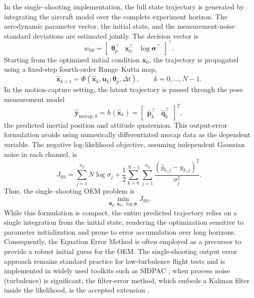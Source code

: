 \documentclass[11pt]{article}
\begin{document}
In the single--shooting implementation, the full state trajectory is generated by
integrating the aircraft model over the complete experiment horizon.
The aerodynamic parameter vector, the initial state, and the measurement-noise
standard deviations are estimated jointly. The decision vector is
\[
    w_{\mathrm{SS}}
    =
    \begin{bmatrix}
        \boldsymbol{\theta}_p^\top &
        \mathbf{x}_0^\top &
        \log\boldsymbol{\sigma}^\top
    \end{bmatrix}^{\!\top}.
\]
Starting from the optimized initial condition $\mathbf{x}_0$, the trajectory is
propagated using a fixed-step fourth-order Runge--Kutta map,
\[
    \hat{\mathbf{x}}_{k+1}
    =
    \Phi(\hat{\mathbf{x}}_k,\mathbf{u}_k;\boldsymbol{\theta}_p,\Delta t),
    \qquad k=0,\ldots,N-1.
\]
In the motion-capture setting,
the latent trajectory is passed through the pose measurement model
\[
\hat{\mathbf{y}}_{\mathrm{mocap},k}
=h(\hat{\mathbf{x}}_k)
=
\begin{bmatrix}
\hat{\mathbf{p}}_k^{\top} & \hat{\mathbf{q}}_k^{\top}
\end{bmatrix}^{T},
\]
the predicted inertial position and attitude quaternion. This output-error
formulation avoids using numerically differentiated mocap data as the
dependent variable. The negative log-likelihood
objective, assuming independent Gaussian noise in each channel, is
\[
    J_{\mathrm{SS}}
    =
    \sum_{j=1}^{n_y} N\log\sigma_j
    +
    \frac{1}{2}
    \sum_{k=0}^{N-1}
    \sum_{j=1}^{n_y}
    \frac{\left(\hat{y}_{k,j}-y_{k,j}\right)^2}{\sigma_j^2}.
\]
Thus, the single--shooting OEM problem is
\[
    \min_{\boldsymbol{\theta}_p,\,\mathbf{x}_0,\,\log\boldsymbol{\sigma}}
    J_{\mathrm{SS}}.
\]
While this formulation is compact, the entire predicted trajectory relies on a single integration from the initial state, rendering the optimization sensitive to parameter initialization and prone to error accumulation over long horizons. Consequently, the Equation Error Method is often employed as a precursor to provide a robust initial guess for the OEM. The single-shooting output error approach remains standard practice for low-turbulence flight tests and is implemented in widely used toolkits such as SIDPAC \cite{Morelli2002SIDPAC}; when process noise (turbulence) is significant, the filter-error method, which embeds a Kalman filter inside the likelihood, is the accepted extension \cite{jategaonkar2006flight}.
\end{document}
